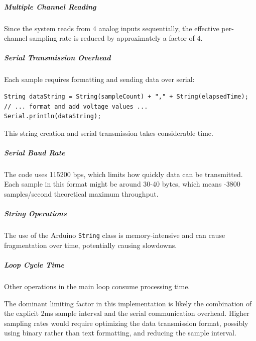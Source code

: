 \subparagraph{Multiple Channel Reading}
Since the system reads from 4 analog inputs sequentially, the effective per-channel sampling rate is reduced by approximately a factor of 4.

\subparagraph{Serial Transmission Overhead}
Each sample requires formatting and sending data over serial:
\begin{verbatim}
String dataString = String(sampleCount) + "," + String(elapsedTime);
// ... format and add voltage values ...
Serial.println(dataString);
\end{verbatim}
This string creation and serial transmission takes considerable time.

\subparagraph{Serial Baud Rate}
The code uses 115200 bps, which limits how quickly data can be transmitted. Each sample in this format might be around 30-40 bytes, which means -3800 samples/second theoretical maximum throughput.

\subparagraph{String Operations}
The use of the Arduino \texttt{String} class is memory-intensive and can cause fragmentation over time, potentially causing slowdowns.

\subparagraph{Loop Cycle Time}
Other operations in the main loop consume processing time.

The dominant limiting factor in this implementation is likely the combination of the explicit 2ms sample interval and the serial communication overhead. Higher sampling rates would require optimizing the data transmission format, possibly using binary rather than text formatting, and reducing the sample interval.